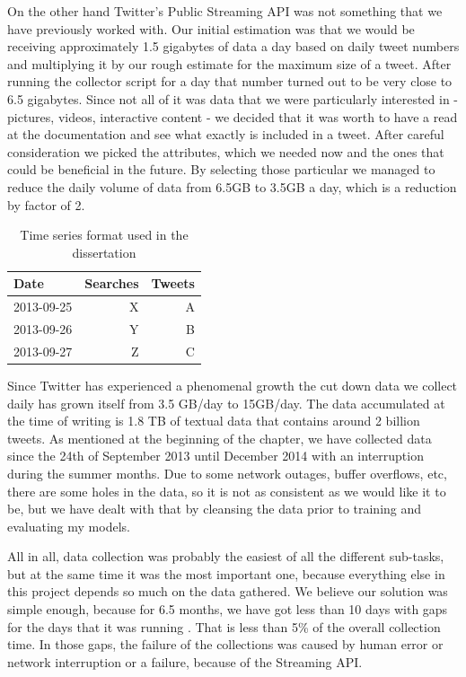 \documentclass[minf,twoside,singlespacing,parskip,frontabs,notimes,12pt]{infthesis} %
\begin{document}
On the other hand Twitter's Public Streaming API was not something that we have previously worked with. Our initial estimation was that we would be receiving approximately 1.5 gigabytes of data a day based on daily tweet numbers and multiplying it by our rough estimate for the maximum size of a tweet. After running the collector script for a day that number turned out to be very close to 6.5 gigabytes. Since not all of it was data that we were particularly interested in - pictures, videos, interactive content - we decided that it was worth to have a read at the documentation and see what exactly is included in a tweet.  After careful consideration we picked the attributes, which we needed now and the ones that could be beneficial in the future. By selecting those particular we managed to reduce the daily volume of data from 6.5GB to 3.5GB a day, which is a reduction by factor of 2. 


\begin{table}[h]
\begin{center}
\begin{tabular}{ l | r  | r }
\textbf{Date} & \textbf{Searches} & \textbf{Tweets} \\ 
\hline
2013-09-25 &  X  & A \\
2013-09-26 &  Y  & B \\
2013-09-27 &  Z & C \\
\end{tabular}
\end{center}
\caption{Time series format used in the dissertation}
\label{ssearches}
\end{table}

Since Twitter has experienced a phenomenal growth the cut down data we collect daily has grown itself from 3.5 GB/day to 15GB/day. The data accumulated at the time of writing is 1.8 TB of textual data that contains around 2 billion tweets. As mentioned at the beginning of the chapter, we have collected data since the 24th of September 2013 until December 2014 with an interruption during the summer months. Due to some network outages, buffer overflows, etc, there are some holes in the data, so it is not as consistent as we would like it to be, but we have dealt with that by cleansing the data prior to training and evaluating my models. 


All in all, data collection was probably the easiest of all the different sub-tasks, but at the same time it was the most important one, because everything else in this project depends so much on the data gathered. We believe our solution was simple enough, because for 6.5 months, we have got less than 10 days with gaps for the days that it was running . That is less than 5\% of the overall collection time. In those gaps, the failure of the collections was caused by human error or network interruption or a failure, because of the Streaming API. 
\end{document}
